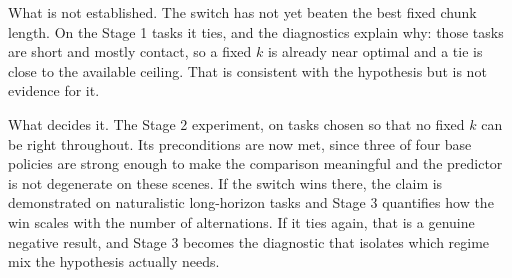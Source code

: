 \documentclass[11pt]{article}
\begin{document}
What is not established. The switch has not yet beaten the best fixed chunk
length. On the Stage 1 tasks it ties, and the diagnostics explain why: those
tasks are short and mostly contact, so a fixed $k$ is already near optimal
and a tie is close to the available ceiling. That is consistent with the
hypothesis but is not evidence for it.

What decides it. The Stage 2 experiment, on tasks chosen so that no fixed $k$
can be right throughout. Its preconditions are now met, since three of four
base policies are strong enough to make the comparison meaningful and the
predictor is not degenerate on these scenes. If the switch wins there, the
claim is demonstrated on naturalistic long-horizon tasks and Stage 3
quantifies how the win scales with the number of alternations. If it ties
again, that is a genuine negative result, and Stage 3 becomes the diagnostic
that isolates which regime mix the hypothesis actually needs.
\end{document}
